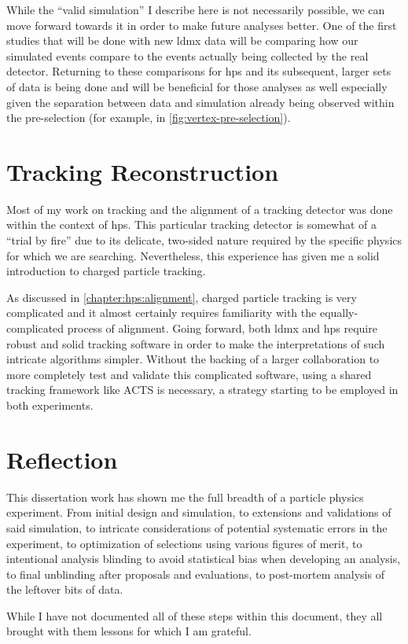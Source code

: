 While the ``valid simulation'' I describe here is not necessarily possible,
we can move forward towards it in order to make future analyses better.
One of the first studies that will be done with new \ac{ldmx} data will
be comparing how our simulated events compare to the events actually being
collected by the real detector.
Returning to these comparisons for \ac{hps} and its subsequent, larger
sets of data is being done and will be beneficial for those analyses as well
especially given the separation between data and simulation already being
observed within the pre-selection (for example, in \cref{fig:vertex-pre-selection}).

\section{Tracking Reconstruction}
Most of my work on tracking and the alignment of a tracking detector
was done within the context of \ac{hps}.
This particular tracking detector is somewhat of a ``trial by fire'' due
to its delicate, two-sided nature required by the specific physics for
which we are searching.
Nevertheless, this experience has given me a solid introduction to charged
particle tracking.

As discussed in \cref{chapter:hps:alignment}, charged particle tracking is
very complicated and it almost certainly requires familiarity with the
equally-complicated process of alignment.
Going forward, both \ac{ldmx} and \ac{hps} require robust and solid tracking
software in order to make the interpretations of such intricate algorithms simpler.
Without the backing of a larger collaboration to more completely test
and validate this complicated software, using a shared tracking framework
like ACTS\cite{acts} is necessary, a strategy starting to be employed in both
experiments.

\section{Reflection}
This dissertation work has shown me the full breadth of a particle physics experiment.
From initial design and simulation, to extensions and validations of said simulation,
to intricate considerations of potential systematic errors in the experiment,
to optimization of selections using various figures of merit,
to intentional analysis blinding to avoid statistical bias when developing an analysis,
to final unblinding after proposals and evaluations,
to post-mortem analysis of the leftover bits of data.

While I have not documented all of these steps within this document,
they all brought with them lessons for which I am grateful.

